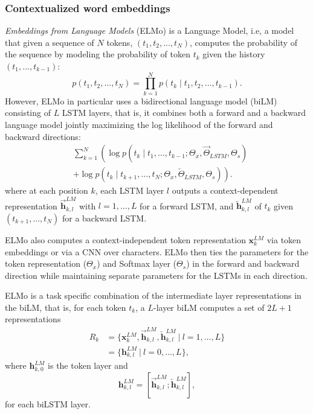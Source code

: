 \subsubsection{Contextualized word embeddings}

\emph{Embeddings from Language Models} (ELMo) \cite{peters-etal-2018-deep} is a Language Model, i.e, a model that given a sequence of $N$ tokens, $(t_1, t_2, ..., t_N)$, computes the probability of the sequence
by modeling the probability of token $t_k$ given the history $(t_1, ..., t_{k-1})$:
\[
    p(t_1, t_2, \ldots, t_N) = \prod_{k=1}^N p({t_k} \mid t_1, t_2, \ldots, t_{k-1}).
\]
However, ELMo in particular uses a bidirectional language model (biLM) consisting of $L$ LSTM layers, that is, it combines both a forward and a backward language model jointly maximizing the log likelihood of the forward and backward directions:
\begin{align*}
     & \sum_{k=1}^N \left( \right. \log p({t_k} \mid t_1, \ldots, t_{k-1}; \Theta_x, \overrightarrow{\Theta}_{LSTM}, \Theta_s) \\
     & + \log p({t_k} \mid t_{k+1}, \ldots, t_{N}; \Theta_x, \overleftarrow{\Theta}_{LSTM}, \Theta_s)
    \left. \right).
\end{align*}
where at each position $k$, each LSTM layer $l$ outputs a context-dependent representation $\overrightarrow{\mathbf{h}}^{LM}_{k,l}$ with $l=1, \ldots, L$ for a forward LSTM, and $\overleftarrow{\mathbf{h}}^{LM}_{k,l}$ of $t_k$ given $(t_{k+1}, \ldots, t_N)$ for a backward LSTM.

ELMo also computes a context-independent token representation $\mathbf{x}^{LM}_{k}$ via token embeddings or via a CNN over characters. ELMo then ties the parameters for the token representation ($\Theta_x$) and Softmax layer ($\Theta_s$) in the forward and backward direction while maintaining separate parameters for the LSTMs in each direction.

ELMo is a task specific combination of the intermediate layer representations in the biLM, that is,
for each token $t_k$, a $L$-layer biLM computes a set of $2L + 1$ representations
\begin{align*}
    R_k & =  \{\mathbf{x}^{LM}_{k}, \overrightarrow{\mathbf{h}}^{LM}_{k,l}, \overleftarrow{\mathbf{h}}^{LM}_{k,l} \ |\  l =1, \ldots, L \} \\
        & =  \{\mathbf{h}^{LM}_{k,l}\ | \ l=0, \ldots, L\},
\end{align*}
where $\mathbf{h}^{LM}_{k,0}$ is the token layer and
\[
    \mathbf{h}^{LM}_{k,l} = [\overrightarrow{\mathbf{h}}^{LM}_{k,l}; \overleftarrow{\mathbf{h}}^{LM}_{k,l}],
\]
for each biLSTM layer.


